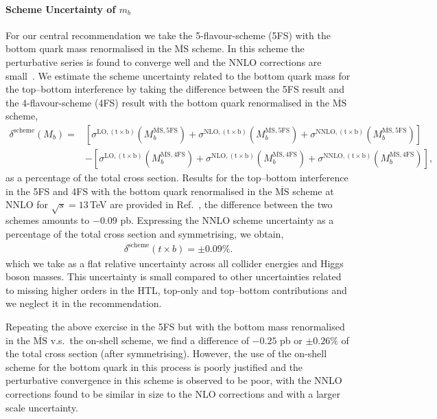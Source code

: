 \paragraph{Scheme Uncertainty of $m_b$}
For our central recommendation we take the 5-flavour-scheme (5FS) with the bottom quark mass renormalised in the $\overline{\mathrm{MS}}$ scheme.
In this scheme the perturbative series is found to converge well and the NNLO corrections are small~\cite{Czakon:2023kqm,Czakon:2024ywb}. 
We estimate the scheme uncertainty related to the bottom quark mass for the top--bottom interference by taking the difference between the 5FS result and the 4-flavour-scheme (4FS) result with the bottom quark renormalised in the $\overline{\mathrm{MS}}$ scheme,
\begin{align}
\delta^\text{scheme}(M_b) = & 
\left[
\sigma^\mathrm{LO,(t \times b)} (M_b^{\overline{\mathrm{MS}},\text{5FS}})
+\sigma^\mathrm{NLO,(t \times b)} (M_b^{\overline{\mathrm{MS}},\text{5FS}})
+\sigma^\mathrm{NNLO,(t \times b)} (M_b^{\overline{\mathrm{MS}},\text{5FS}})
\right] \nonumber \\
& - 
\left[
\sigma^\mathrm{LO,(t \times b)} (M_b^{\overline{\mathrm{MS}},\text{4FS}})
+\sigma^\mathrm{NLO,(t \times b)} (M_b^{\overline{\mathrm{MS}},\text{4FS}})
+\sigma^\mathrm{NNLO,(t \times b)} (M_b^{\overline{\mathrm{MS}},\text{4FS}})
\right],
\end{align}
as a percentage of the total cross section.
Results for the top--bottom interference in the 5FS and 4FS with the bottom quark renormalised in the $\overline{\mathrm{MS}}$ scheme at NNLO for $\sqrt{s}=  13$\,TeV are provided in Ref.~\cite{Czakon:2024ywb}, the difference between the two schemes amounts to $-0.09$ pb.
Expressing the NNLO scheme uncertainty as a percentage of the total cross section and symmetrising, we obtain,
\begin{align}
\delta^\mathrm{scheme}(t\times b) = \pm 0.09\%.
\end{align}
which we take as a flat relative uncertainty across all collider energies and Higgs boson masses.
This uncertainty is small compared to other uncertainties related to missing higher orders in the HTL, top-only and top--bottom contributions and we neglect it in the recommendation.

Repeating the above exercise in the 5FS but with the bottom mass renormalised in the $\overline{\mathrm{MS}}$ v.s.\ the on-shell scheme, we find a difference of $-0.25$ pb or $\pm 0.26 \%$ of the total cross section (after symmetrising).
However, the use of the on-shell scheme for the bottom quark in this process is poorly justified and the perturbative convergence in this scheme is observed to be poor, with the NNLO corrections found to be similar in size to the NLO corrections and with a larger scale uncertainty.

